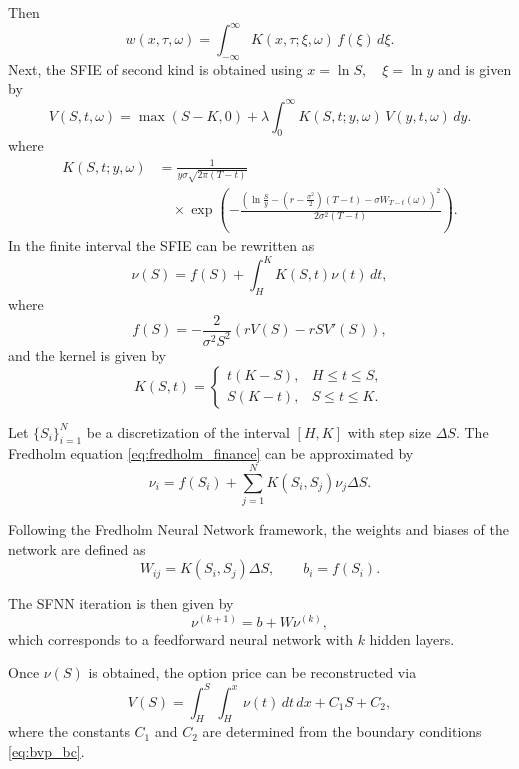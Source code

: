 \documentclass[preprint,12pt,authoryear]{elsarticle}
\begin{document}
Then
\begin{equation}
w(x,\tau,\omega)
=
\int_{-\infty}^{\infty}
K(x,\tau;\xi,\omega)\, f(\xi)\, d\xi.
\end{equation}
Next, the SFIE of second kind is obtained using $x = \ln S, \quad \xi = \ln y$ and is given by
\begin{equation}
V(S,t,\omega)
=
\max(S-K,0)
+
\lambda \int_0^\infty
K(S,t;y,\omega)\,
V(y,t,\omega)\, dy.
\end{equation}
where
\begin{align}
K(S,t;y,\omega)\nonumber
&=
\frac{1}{y\sigma\sqrt{2\pi (T-t)}} \\
&\quad \times
\exp\left(
-\frac{
\left(
\ln\frac{S}{y}
-
\left(r-\frac{\sigma^2}{2}\right)(T-t)
-
\sigma W_{T-t}(\omega)
\right)^2
}{2\sigma^2 (T-t)}
\right).
\end{align}
In the finite interval the SFIE can be rewritten as 
\begin{equation}
\nu(S) = f(S) + \int_H^K K(S,t)\nu(t)\,dt,
\label{eq:fredholm_finance}
\end{equation}
where
\[
f(S) = -\frac{2}{\sigma^2 S^2}
\left( rV(S) - rS V'(S) \right),
\]
and the kernel is given by
\[
K(S,t) =
\begin{cases}
t(K-S), & H \le t \le S, \\
S(K-t), & S \le t \le K .
\end{cases}
\]


Let $\{S_i\}_{i=1}^N$ be a discretization of the interval $[H,K]$ with
step size $\Delta S$. The Fredholm equation \eqref{eq:fredholm_finance}
can be approximated by
\[
\nu_i = f(S_i) + \sum_{j=1}^N K(S_i,S_j)\nu_j \Delta S .
\]

Following the Fredholm Neural Network framework, the weights and biases
of the network are defined as
\[
W_{ij} = K(S_i,S_j)\Delta S,
\qquad
b_i = f(S_i).
\]

The SFNN iteration is then given by
\[
\nu^{(k+1)} = b + W \nu^{(k)},
\]
which corresponds to a feedforward neural network with $k$ hidden layers.

Once $\nu(S)$ is obtained, the option price can be reconstructed via
\[
V(S) = \int_H^S \int_H^x \nu(t)\,dt\,dx + C_1 S + C_2,
\]
where the constants $C_1$ and $C_2$ are determined from the boundary
conditions \eqref{eq:bvp_bc}.
\end{document}
